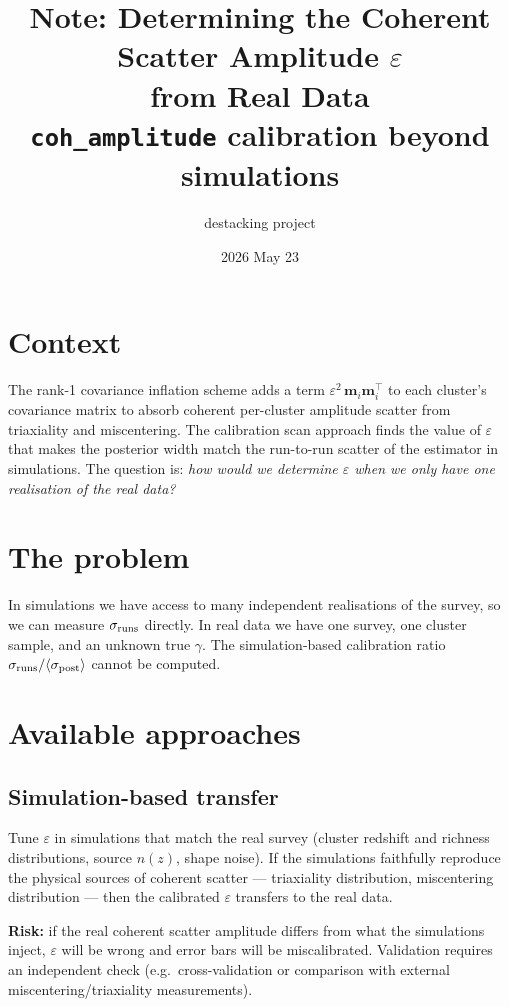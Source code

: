 \documentclass[11pt,a4paper]{article}
\title{\textbf{Note: Determining the Coherent Scatter Amplitude $\varepsilon$\\
from Real Data}\\[0.4em]
\large \texttt{coh\_amplitude} calibration beyond simulations}
\author{destacking project}
\date{2026 May 23}
\begin{document}
\maketitle

\section*{Context}

The rank-1 covariance inflation scheme adds a term
$\varepsilon^2\,\mathbf{m}_i\mathbf{m}_i^\top$ to each cluster's covariance
matrix to absorb coherent per-cluster amplitude scatter from triaxiality and
miscentering.  The calibration scan approach finds the value of $\varepsilon$
that makes the posterior width match the run-to-run scatter of the estimator
in simulations.  The question is: \emph{how would we determine $\varepsilon$
when we only have one realisation of the real data?}

\section{The problem}

In simulations we have access to many independent realisations of the survey,
so we can measure $\sigma_{\rm runs}$ directly.  In real data we have one
survey, one cluster sample, and an unknown true $\gamma$.  The simulation-based
calibration ratio $\sigma_{\rm runs}/\langle\sigma_{\rm post}\rangle$ cannot be
computed.

\section{Available approaches}

\subsection{Simulation-based transfer}
Tune $\varepsilon$ in simulations that match the real survey (cluster
redshift and richness distributions, source $n(z)$, shape noise).  If the
simulations faithfully reproduce the physical sources of coherent scatter —
triaxiality distribution, miscentering distribution — then the calibrated
$\varepsilon$ transfers to the real data.

\textbf{Risk:} if the real coherent scatter amplitude differs from what the
simulations inject, $\varepsilon$ will be wrong and error bars will be
miscalibrated.  Validation requires an independent check (e.g.\
cross-validation or comparison with external miscentering/triaxiality
measurements).
\end{document}
